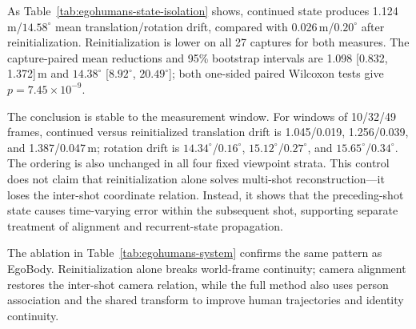 As Table~\ref{tab:egohumans-state-isolation} shows, continued state produces
1.124\,m/$14.58^\circ$ mean translation/rotation drift, compared with
0.026\,m/$0.20^\circ$ after reinitialization. Reinitialization is lower on all
27 captures for both measures. The capture-paired mean reductions and 95\%
bootstrap intervals are 1.098 [0.832, 1.372]\,m and
$14.38^\circ$ [$8.92^\circ$, $20.49^\circ$]; both one-sided paired Wilcoxon
tests give $p=7.45\!\times\!10^{-9}$.

The conclusion is stable to the measurement window. For windows of 10/32/49 frames,
continued versus reinitialized translation drift is
1.045/0.019, 1.256/0.039, and 1.387/0.047\,m; rotation drift is
$14.34^\circ$/$0.16^\circ$, $15.12^\circ$/$0.27^\circ$, and
$15.65^\circ$/$0.34^\circ$. The ordering is also unchanged in all four fixed
viewpoint strata. This control does not claim that reinitialization alone
solves multi-shot reconstruction---it loses the inter-shot coordinate relation.
Instead, it shows that the preceding-shot state causes time-varying error
within the subsequent shot, supporting separate treatment of alignment and
recurrent-state propagation.

The ablation in Table~\ref{tab:egohumans-system} confirms the same pattern as
EgoBody. Reinitialization alone breaks world-frame continuity; camera
alignment restores the inter-shot camera relation, while the full method also
uses person association and the shared transform to improve human trajectories
and identity continuity.

\begin{table}[t]
  \centering
  \caption{Effects of alignment, state reinitialization, and association on
  EgoHumans. W/WA/MPJPE are in mm and cross-shot root error is in m.}
  \label{tab:egohumans-system}
  \supptablesize
  
\end{table}

